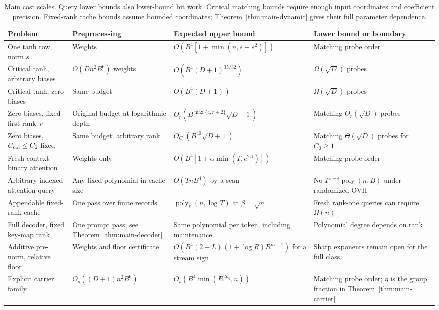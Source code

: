 \documentclass[11pt]{article}
\theoremstyle{definition}
\theoremstyle{remark}
\newcommand{\poly}{\operatorname{poly}}
\numberwithin{equation}{section}
\begin{document}
\begin{table}[t]
\centering\small
\setlength{\tabcolsep}{4pt}
\begin{tabularx}{\textwidth}{@{}>{\raggedright\arraybackslash}p{}>{\raggedright\arraybackslash}p{}Y Y@{}}
\toprule
Problem & Preprocessing & Expected upper bound & Lower bound or boundary\\
\midrule
One tanh row, norm $s$ & Weights &
$O(B^4[1+\min(n,s+s^2)])$ & Matching probe order\\
\addlinespace
Critical tanh, arbitrary biases & $O(Dn^2B^6)$ weights &
$O(B^4(D+1)^{35/32})$ & $\Omega(\sqrt D)$ probes\\
\addlinespace
Critical tanh, zero biases & Same budget &
$O(B^4(D+1))$ & $\Omega(\sqrt D)$ probes\\
\addlinespace
Zero biases, fixed first rank~$r$ & Original budget at logarithmic depth &
$O_r(B^{\max\{4,r+2\}}\sqrt{D+1})$ & Matching $\Theta_r(\sqrt D)$ probes\\
\addlinespace
Zero biases, $C_{\rm col}\le C_0$ fixed & Same budget; arbitrary rank &
$O_{C_0}(B^{40}\sqrt{D+1})$ & Matching $\Theta(\sqrt D)$ probes for $C_0\ge1$\\
\addlinespace
Fresh-context binary attention & Weights only &
$O(B^4[1+\alpha\min(T,e^{2A})])$ & Matching probe order\\
\addlinespace
Arbitrary indexed attention query & Any fixed polynomial in cache size &
$O(TnB^4)$ by a scan & No $T^{1-\epsilon}\poly(n,B)$ under randomized OVH\\
\addlinespace
Appendable fixed-rank cache & One pass over finite records &
$\poly_r(n,\log T)$ at $\beta=\sqrt n$ & Fresh rank-one queries can require $\Omega(n)$\\
\addlinespace
Full decoder, fixed key-map rank & One prompt pass; see Theorem~\ref{thm:main-decoder} &
Same polynomial per token, including maintenance & Polynomial degree depends on rank\\
\addlinespace
Additive pre-norm, relative floor & Weights and floor certificate &
$O(B^4{(2+L)}\allowbreak{(1+\log R)}R^{m-1})$ for a stream sign & Sharp exponents remain open for the full class\\
\addlinespace
Explicit carrier family & $O_s((D+1)n^2B^6)$ &
$O_s(B^4\min(R^{2\nu_\eta},n))$ & Matching probe order; $\eta$ is the group fraction in Theorem~\ref{thm:main-carrier}\\
\bottomrule
\end{tabularx}
\caption{Main cost scales. Query lower bounds also lower-bound bit work.
Critical matching bounds require enough input coordinates and coefficient
precision. Fixed-rank cache bounds assume bounded coordinates;
Theorem~\ref{thm:main-dynamic} gives their full parameter dependence.}
\label{tab:results}
\end{table}
\end{document}
